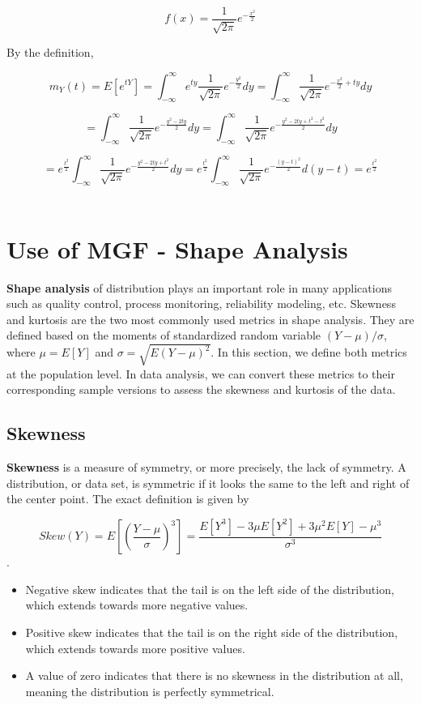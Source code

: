 \documentclass[
]{book}
\begin{document}
\[
f(x) = \frac{1}{\sqrt{2\pi}}e^{-\frac{x^2}{2}}
\]

By the definition,

\[
m_Y(t) = E[e^{tY}] = \int_{-\infty}^\infty e^{ty} \frac{1}{\sqrt{2\pi}}e^{-\frac{y^2}{2}}dy =\int_{-\infty}^\infty \frac{1}{\sqrt{2\pi}}e^{-\frac{x^2}{2}+ty}dy
\]

\[
=\int_{-\infty}^\infty \frac{1}{\sqrt{2\pi}}e^{-\frac{y^2-2ty}{2}}dy = \int_{-\infty}^\infty \frac{1}{\sqrt{2\pi}}e^{-\frac{y^2-2ty+t^2 - t^2}{2}}dy
\]

\[
= e^{\frac{t^2}{2}}\int_{-\infty}^\infty \frac{1}{\sqrt{2\pi}}e^{-\frac{y^2-2ty+t^2}{2}}dy = e^{\frac{t^2}{2}}\int_{-\infty}^\infty \frac{1}{\sqrt{2\pi}}e^{-\frac{(y-t)^2}{2}}d(y-t) = e^{\frac{t^2}{2}}
\]\\

\hfill\break

\hypertarget{use-of-mgf---shape-analysis}{%
\section{Use of MGF - Shape Analysis}\label{use-of-mgf---shape-analysis}}

\textbf{Shape analysis} of distribution plays an important role in many applications such as quality control, process monitoring, reliability modeling, etc. Skewness and kurtosis are the two most commonly used metrics in shape analysis. They are defined based on the moments of standardized random variable \((Y-\mu)/\sigma\), where \(\mu = E[Y]\) and \(\sigma = \sqrt{E(Y-\mu)^2}\). In this section, we define both metrics at the population level. In data analysis, we can convert these metrics to their corresponding sample versions to assess the skewness and kurtosis of the data.

\hypertarget{skewness}{%
\subsection{Skewness}\label{skewness}}

\textbf{Skewness} is a measure of symmetry, or more precisely, the lack of symmetry. A distribution, or data set, is symmetric if it looks the same to the left and right of the center point. The exact definition is given by

\[
Skew(Y) = E\left[ \left(\frac{Y-\mu}{\sigma}\right)^3\right]=\frac{E[Y^3] -3\mu E[Y^2] + 3\mu^2 E[Y]-\mu^3}{\sigma^3}
\].

\begin{itemize}
\item
  Negative skew indicates that the tail is on the left side of the distribution, which extends towards more negative values.
\item
  Positive skew indicates that the tail is on the right side of the distribution, which extends towards more positive values.
\item
  A value of zero indicates that there is no skewness in the distribution at all, meaning the distribution is perfectly symmetrical.
\end{itemize}
\end{document}
